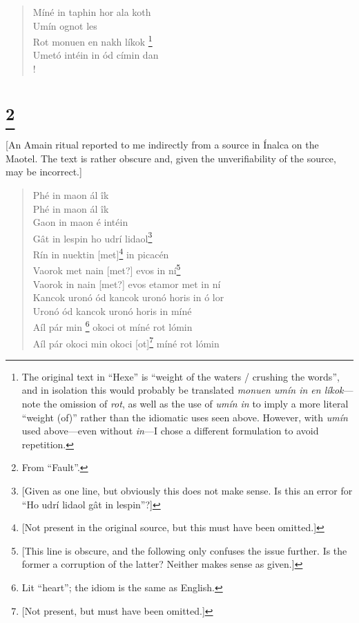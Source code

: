 \documentclass{article}
\let\oldthefootnote\thefootnote
\newcommand\oocfootnote[2][DarkGreen]{\renewcommand\thefootnote{\color{#1}\oldthefootnote}%
  \footnote{\color{#1}#2}%
  \renewcommand{\thefootnote}{\oldthefootnote}}
\begin{document}
\begin{verse}
Míné in taphin hor ala koth \\
Umín ognot les \\
Rot monuen en nakh líkok\oocfootnote{The original text in ``Hexe'' is ``weight of the waters / crushing the words'', and in isolation this would probably be translated \emph{monuen umín in en líkok}—note the omission of \emph{rot}, as well as the use of \emph{umín in} to imply a more literal ``weight (of)'' rather than the idiomatic uses seen above. However, with \emph{umín} used above—even without \emph{in}—I chose a different formulation to avoid repetition.} \\
Umetó intéin in ód címin dan \\!

\end{verse}

\section{\oocfootnote{From ``Fault''.}}

[An Amain ritual reported to me indirectly from a source in Ínalca on the Maotel. The text is rather obscure and, given the unverifiability of the source, may be incorrect.]


\begin{verse}
Phé in maon ál îk \\
Phé in maon ál îk \\
Gaon in maon é intéin \\
Gât in lespin ho udrí lidaol\footnote{[Given as one line, but obviously this does not make sense. Is this an error for ``Ho udrí lidaol gât in lespin''?]} \\
Rín in nuektin [met]\footnote{[Not present in the original source, but this must have been omitted.]} in picacén \\
Vaorok met nain [met?] evos in ní\footnote{[This line is obscure, and the following only confuses the issue further. Is the former a corruption of the latter? Neither makes sense as given.]} \\
Vaorok in nain [met?] evos etamor met in ní \\
Kancok uronó ód kancok uronó horis in ó lor \\
Uronó ód kancok uronó horis in míné \\
Aíl pár min\oocfootnote{Lit ``heart''; the idiom is the same as English.} okoci ot míné rot lómin \\
Aíl pár okoci min okoci [ot]\footnote{[Not present, but must have been omitted.]} míné rot lómin \\

\end{verse}
\end{document}
